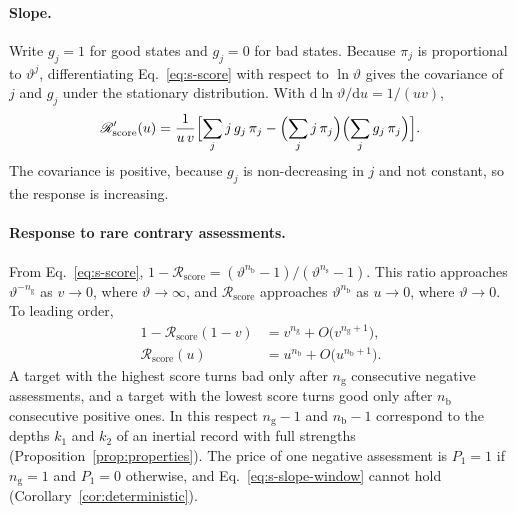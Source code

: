 \documentclass[10pt]{wlscirep}
\newcommand{\Rmap}{\mathscr{R}}            %
\newcommand{\Pone}{P_{1}}                  %
\newcommand{\dd}{\mathrm{d}}
\theoremstyle{plain}
\theoremstyle{remark}
\begin{document}
\paragraph{Slope.} Write $g_j=1$ for good states and $g_j=0$ for bad states. Because $\pi_j$ is proportional to $\vartheta^j$, differentiating Eq.~\eqref{eq:s-score} with respect to $\ln\vartheta$ gives the covariance of $j$ and $g_j$ under the stationary distribution. With $\dd\ln\vartheta/\dd u=1/(uv)$,
\begin{equation}
\Rmap'_{\mathrm{score}}(u)=\frac{1}{u\,v}\Bigl[\sum_jj\,g_j\,\pi_j-\Bigl(\sum_jj\,\pi_j\Bigr)\Bigl(\sum_jg_j\,\pi_j\Bigr)\Bigr].
\label{eq:s-score-derivative}
\end{equation}
The covariance is positive, because $g_j$ is non-decreasing in $j$ and not constant, so the response is increasing.

\paragraph{Response to rare contrary assessments.} From Eq.~\eqref{eq:s-score}, $1-\Rmap_{\mathrm{score}}=(\vartheta^{n_{\mathrm b}}-1)/(\vartheta^{n_{\mathrm s}}-1)$. This ratio approaches $\vartheta^{-n_{\mathrm g}}$ as $v\to0$, where $\vartheta\to\infty$, and $\Rmap_{\mathrm{score}}$ approaches $\vartheta^{n_{\mathrm b}}$ as $u\to0$, where $\vartheta\to0$. To leading order,
\begin{equation}
\begin{aligned}
1-\Rmap_{\mathrm{score}}(1-v)&=v^{n_{\mathrm g}}+O\bigl(v^{n_{\mathrm g}+1}\bigr),\\
\Rmap_{\mathrm{score}}(u)&=u^{n_{\mathrm b}}+O\bigl(u^{n_{\mathrm b}+1}\bigr).
\end{aligned}
\label{eq:s-score-limits}
\end{equation}
A target with the highest score turns bad only after $n_{\mathrm g}$ consecutive negative assessments, and a target with the lowest score turns good only after $n_{\mathrm b}$ consecutive positive ones. In this respect $n_{\mathrm g}-1$ and $n_{\mathrm b}-1$ correspond to the depths $k_1$ and $k_2$ of an inertial record with full strengths (Proposition~\ref{prop:properties}). The price of one negative assessment is $\Pone=1$ if $n_{\mathrm g}=1$ and $\Pone=0$ otherwise, and Eq.~\eqref{eq:s-slope-window} cannot hold (Corollary~\ref{cor:deterministic}).
\end{document}
